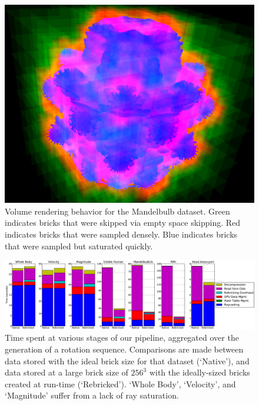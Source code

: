 \begin{figure}[t]
  \centering
  \includegraphics[width=0.95\linewidth]{images/rg/terminate-empty.png}
  \caption{Volume rendering behavior for the Mandelbulb dataset.
  Green indicates bricks that were skipped via empty space skipping.
  Red indicates bricks that were sampled densely.  Blue indicates
  bricks that were sampled but saturated quickly.
  }
  \label{figrg:bricks-empty}
\end{figure}

\begin{figure}
  \centering
  \includegraphics[width=1.00\linewidth]{images/rg/breakdown.pdf}

  \caption{Time spent at various stages of our pipeline, aggregated
  over the generation of a rotation sequence.  Comparisons are made
  between data stored with the ideal brick size for that dataset
  (`Native'), and data stored at a large brick size of $256^3$ with
  the ideally-sized bricks created at run-time (`Rebricked').  `Whole
  Body', `Velocity', and `Magnitude' suffer from a lack of ray
  saturation.}

  \label{figrg:breakdown}
\end{figure}


